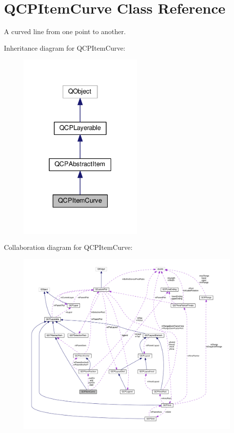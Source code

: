 \hypertarget{classQCPItemCurve}{}\section{Q\+C\+P\+Item\+Curve Class Reference}
\label{classQCPItemCurve}


A curved line from one point to another.  




Inheritance diagram for Q\+C\+P\+Item\+Curve\+:
\nopagebreak
\begin{figure}[H]
\begin{center}
\leavevmode
\includegraphics[width=175pt]{classQCPItemCurve__inherit__graph}
\end{center}
\end{figure}


Collaboration diagram for Q\+C\+P\+Item\+Curve\+:
\nopagebreak
\begin{figure}[H]
\begin{center}
\leavevmode
\includegraphics[width=350pt]{classQCPItemCurve__coll__graph}
\end{center}
\end{figure}
